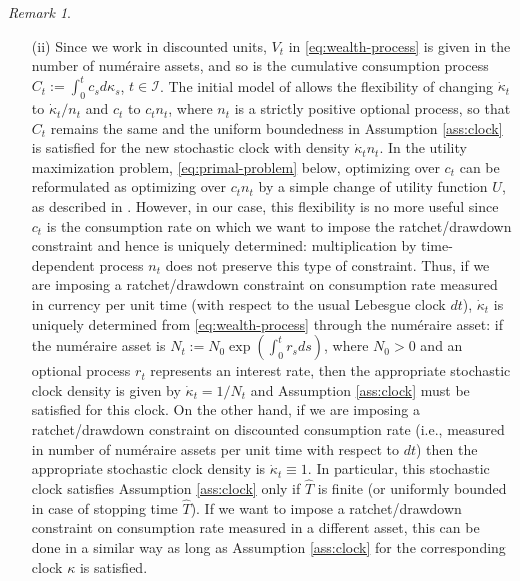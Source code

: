 \documentclass[11pt, oneside]{article}   	%
\theoremstyle{plain}
\theoremstyle{definition}
\theoremstyle{remark}
\newtheorem{rem}[thm]{Remark}
\begin{document}
\begin{rem}
\begin{enumerate}
\item[(ii)] Since we work in discounted units, $V_t$ in \eqref{eq:wealth-process} is given in the number of num\'eraire assets, and so is the cumulative consumption process $C_t:=\int_0^t c_s d\kappa_s$, $t\in\mathcal{I}$. The initial model of \cite{mostovyi} allows the flexibility of changing $\dot\kappa_t$ to $\dot\kappa_t/n_t$ and $c_t$ to $c_tn_t$, where $n_t$ is a strictly positive optional process, so that $C_t$ remains the same and the uniform boundedness in Assumption \ref{ass:clock} is satisfied for the new stochastic clock with density $\dot\kappa_tn_t$. In the utility maximization problem, \eqref{eq:primal-problem} below, optimizing over $c_t$ can be reformulated as optimizing over $c_tn_t$ by a simple change of utility function $U$, as described in \cite[Remark 2.2]{mostovyi}. However, in our case, this flexibility is no more useful since $c_t$ is the consumption rate on which we want to impose the ratchet/drawdown constraint and hence is uniquely determined: multiplication by time-dependent process $n_t$ does not preserve this type of constraint. Thus, if we are imposing a ratchet/drawdown constraint on consumption rate measured in currency per unit time (with respect to the usual Lebesgue clock $dt$), $\dot\kappa_t$ is uniquely determined from \eqref{eq:wealth-process} through the num\'eraire asset: if the num\'eraire asset is $N_t:=N_0\exp\left(\int_0^t r_sds\right)$, where  $N_0>0$ and an optional process $r_t$ represents an interest rate, then the appropriate stochastic clock density is given by $\dot\kappa_t=1/N_t$ and Assumption \ref{ass:clock} must be satisfied for this clock. On the other hand, if we are imposing a ratchet/drawdown constraint on discounted consumption rate (i.e., measured in number of num\'eraire assets per unit time with respect to $dt$) then the appropriate stochastic clock density is $\dot\kappa_t\equiv1$. In particular, this stochastic clock satisfies Assumption \ref{ass:clock} only if $\hat{T}$ is finite (or uniformly bounded in case of stopping time $\hat{T}$). If we want to impose a ratchet/drawdown constraint on consumption rate measured in a different asset, this can be done in a similar way as long as Assumption \ref{ass:clock} for the corresponding clock $\kappa$ is satisfied.
\end{enumerate}
\end{rem}
\end{document}
